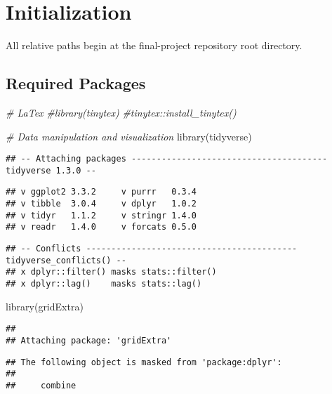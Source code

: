 \documentclass[
]{article}
\newenvironment{Shaded}{\begin{snugshade}}{\end{snugshade}}
\newcommand{\CommentTok}[1]{\textcolor[rgb]{0.56,0.35,0.01}{\textit{#1}}}
\newcommand{\FunctionTok}[1]{\textcolor[rgb]{0.00,0.00,0.00}{#1}}
\newcommand{\NormalTok}[1]{#1}
\begin{document}
\hypertarget{initialization}{%
\section{Initialization}\label{initialization}}

All relative paths begin at the final-project repository root directory.

\hypertarget{required-packages}{%
\subsection{Required Packages}\label{required-packages}}

\begin{Shaded}
\begin{Highlighting}[]
\CommentTok{\# LaTex}
\CommentTok{\#library(tinytex)}
\CommentTok{\#tinytex::install\_tinytex()}

\CommentTok{\# Data manipulation and visualization}
\FunctionTok{library}\NormalTok{(tidyverse)}
\end{Highlighting}
\end{Shaded}

\begin{verbatim}
## -- Attaching packages --------------------------------------- tidyverse 1.3.0 --
\end{verbatim}

\begin{verbatim}
## v ggplot2 3.3.2     v purrr   0.3.4
## v tibble  3.0.4     v dplyr   1.0.2
## v tidyr   1.1.2     v stringr 1.4.0
## v readr   1.4.0     v forcats 0.5.0
\end{verbatim}

\begin{verbatim}
## -- Conflicts ------------------------------------------ tidyverse_conflicts() --
## x dplyr::filter() masks stats::filter()
## x dplyr::lag()    masks stats::lag()
\end{verbatim}

\begin{Shaded}
\begin{Highlighting}[]
\FunctionTok{library}\NormalTok{(gridExtra)}
\end{Highlighting}
\end{Shaded}

\begin{verbatim}
## 
## Attaching package: 'gridExtra'
\end{verbatim}

\begin{verbatim}
## The following object is masked from 'package:dplyr':
## 
##     combine
\end{verbatim}
\end{document}
